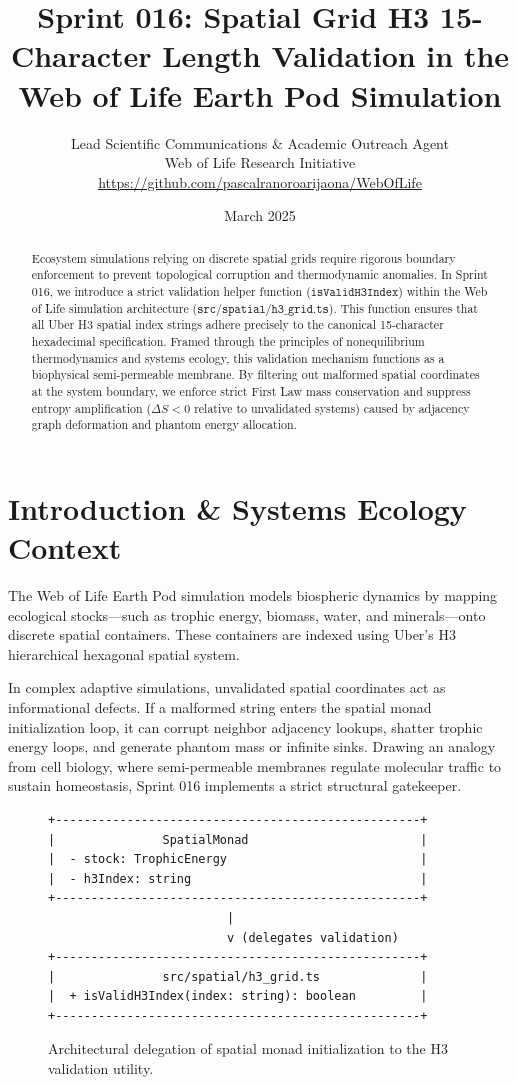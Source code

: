 \documentclass[11pt, a4paper]{article}
\title{\textbf{Sprint 016: Spatial Grid H3 15-Character Length Validation in the Web of Life Earth Pod Simulation}}
\author{Lead Scientific Communications \& Academic Outreach Agent \\ Web of Life Research Initiative \\ \url{https://github.com/pascalranoroarijaona/WebOfLife}}
\date{March 2025}
\begin{document}
\maketitle

\begin{abstract}
Ecosystem simulations relying on discrete spatial grids require rigorous boundary enforcement to prevent topological corruption and thermodynamic anomalies. In Sprint 016, we introduce a strict validation helper function ($\texttt{isValidH3Index}$) within the Web of Life simulation architecture ($\texttt{src/spatial/h3\_grid.ts}$). This function ensures that all Uber H3 spatial index strings adhere precisely to the canonical 15-character hexadecimal specification. Framed through the principles of nonequilibrium thermodynamics and systems ecology, this validation mechanism functions as a biophysical semi-permeable membrane. By filtering out malformed spatial coordinates at the system boundary, we enforce strict First Law mass conservation and suppress entropy amplification ($\Delta S < 0$ relative to unvalidated systems) caused by adjacency graph deformation and phantom energy allocation.
\end{abstract}

\section{Introduction \& Systems Ecology Context}
The Web of Life Earth Pod simulation models biospheric dynamics by mapping ecological stocks---such as trophic energy, biomass, water, and minerals---onto discrete spatial containers. These containers are indexed using Uber's H3 hierarchical hexagonal spatial system. 

In complex adaptive simulations, unvalidated spatial coordinates act as informational defects. If a malformed string enters the spatial monad initialization loop, it can corrupt neighbor adjacency lookups, shatter trophic energy loops, and generate phantom mass or infinite sinks. Drawing an analogy from cell biology, where semi-permeable membranes regulate molecular traffic to sustain homeostasis, Sprint 016 implements a strict structural gatekeeper.

\begin{figure}[htbp]
\centering
\begin{verbatim}
+---------------------------------------------------+
|               SpatialMonad                        |
|  - stock: TrophicEnergy                           |
|  - h3Index: string                                |
+---------------------------------------------------+
                         |
                         v (delegates validation)
+---------------------------------------------------+
|               src/spatial/h3_grid.ts              |
|  + isValidH3Index(index: string): boolean         |
+---------------------------------------------------+
\end{verbatim}
\caption{Architectural delegation of spatial monad initialization to the H3 validation utility.}
\label{fig:architecture}
\end{figure}
\end{document}
